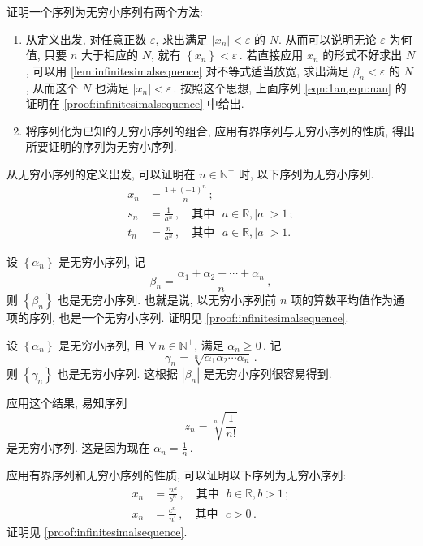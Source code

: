 \documentclass{book}
\newcommand{\Any}{\forall\,}
\newcommand{\set}[1]{\left\{#1\right\}}
\newcommand{\abs}[1]{\left\lvert #1 \right\rvert}
\newcommand{\R}{\mathbb{R}}
\newcommand{\N}{\mathbb{N}}
\renewcommand{\ge}{\geqslant}
\numberwithin{equation}{section}
\numberwithin{figure}{section}
\theoremstyle{definition}
\begin{document}
证明一个序列为无穷小序列有两个方法:
\begin{enumerate}
  \item 从定义出发, 对任意正数 $\varepsilon$, 求出满足 $\abs{x_n}<\varepsilon$ 的 $N$. 从而可以说明无论 $\varepsilon$ 为何值, 只要 $n$ 大于相应的 $N$, 就有 $\set{x_n}<\varepsilon$\,. 若直接应用 $x_n$ 的形式不好求出 $N$, 可以用 \cref{lem:infinitesimalsequence} 对不等式适当放宽, 求出满足 $\beta_n<\varepsilon$ 的 $N$, 从而这个 $N$ 也满足 $\abs{x_n}<\varepsilon$\,.
按照这个思想, 上面序列 \cref{eqn:1an,eqn:nan} 的证明在 \cref{proof:infinitesimalsequence} 中给出.
  \item 将序列化为已知的无穷小序列的组合, 应用有界序列与无穷小序列的性质, 得出所要证明的序列为无穷小序列. 
\end{enumerate}

从无穷小序列的定义出发, 可以证明在 $n\in\N^+$ 时, 以下序列为无穷小序列.
\begin{align}
  x_n&=\frac{1+(-1)^n}{n}\,;\\
  s_n&=\frac{1}{a^n}\,,\quad \text{其中{} }a\in\R,\abs{a}>1\,; \label{eqn:1an}\\
  t_n&=\frac{n}{a^n}\,,\quad \text{其中{} }a\in\R,\abs{a}>1.\label{eqn:nan}
\end{align}

设 $\set{\alpha_n}$ 是无穷小序列, 记
\begin{equation}
  \beta_n=\frac{\alpha_1+\alpha_2+\cdots+\alpha_n}{n}\,,\label{eqn:averageSequence}
\end{equation}
则 $\set{\beta_n}$ 也是无穷小序列. 也就是说, 以无穷小序列前 $n$ 项的算数平均值作为通项的序列, 也是一个无穷小序列. 证明见 \cref{proof:infinitesimalsequence}.

设 $\set{\alpha_n}$ 是无穷小序列, 且 $\Any n\in\N^+$, 满足 $\alpha_n\ge0$\,. 记
\begin{equation}\label{eqn:geometricAvergeSequence}
  \gamma_n=\sqrt[n]{\alpha_1\alpha_2\cdots\alpha_n}\,.
\end{equation}
则 $\set{\gamma_n}$ 也是无穷小序列. 这根据 $\abs{\beta_n}$ 是无穷小序列很容易得到.

应用这个结果, 易知序列
\begin{equation*}
  z_n=\sqrt[n]{\frac{1}{n!}}
\end{equation*}
是无穷小序列. 这是因为现在 $\alpha_n=\frac{1}{n}$\,.

应用有界序列和无穷小序列的性质, 可以证明以下序列为无穷小序列:
\begin{align*}
  x_n&=\frac{n^k}{b^n}\,,\quad\text{其中{} }b\in\R,b>1\,;\\
  x_n&=\frac{c^n}{n!}\,,\quad\text{其中{} }c>0\,.
\end{align*}
证明见 \cref{proof:infinitesimalsequence}.
\end{document}
